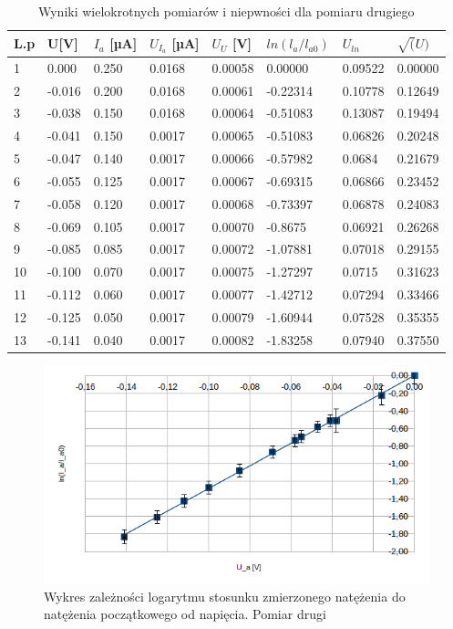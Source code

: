 \documentclass[a4paper]{article}
\begin{document}
\begin{table}[h!]
\centering
 \begin{tabular}{ | l | l | l | l | l | l | l | l | }
 \hline
L.p & U[V] & $I_{a}$ [µA] & $U_{I_{a}}$ [µA] & $U_{U}$ [V] & $ln(l_{a}/l_{a0})$ & $U_{ln}$ & $\sqrt(U)$ \\ \hline
1 & 0.000 & 0.250 & 0.0168 & 0.00058 & 0.00000 & 0.09522 & 0.00000 \\ \hline
2 & -0.016 & 0.200 & 0.0168 & 0.00061 & -0.22314 & 0.10778 & 0.12649 \\ \hline
3 & -0.038 & 0.150 & 0.0168 & 0.00064 & -0.51083 & 0.13087 & 0.19494 \\ \hline
4 & -0.041 & 0.150 & 0.0017 & 0.00065 & -0.51083 & 0.06826 & 0.20248 \\ \hline
5 & -0.047 & 0.140 & 0.0017 & 0.00066 & -0.57982 & 0.0684 & 0.21679 \\ \hline
6 & -0.055 & 0.125 & 0.0017 & 0.00067 & -0.69315 & 0.06866 & 0.23452 \\ \hline
7 & -0.058 & 0.120 & 0.0017 & 0.00068 & -0.73397 & 0.06878 & 0.24083 \\ \hline
8 & -0.069 & 0.105 & 0.0017 & 0.00070 & -0.8675 & 0.06921 & 0.26268 \\ \hline
9 & -0.085 & 0.085 & 0.0017 & 0.00072 & -1.07881 & 0.07018 & 0.29155 \\ \hline
10 & -0.100 & 0.070 & 0.0017 & 0.00075 & -1.27297 & 0.0715 & 0.31623 \\ \hline
11 & -0.112 & 0.060 & 0.0017 & 0.00077 & -1.42712 & 0.07294 & 0.33466 \\ \hline
12 & -0.125 & 0.050 & 0.0017 & 0.00079 & -1.60944 & 0.07528 & 0.35355 \\ \hline
13 & -0.141 & 0.040 & 0.0017 & 0.00082 & -1.83258 & 0.07940 & 0.37550 \\ \hline
 \end{tabular}
	\caption{Wyniki wielokrotnych pomiarów i niepwności dla pomiaru drugiego}
	\label{pomiary-2}
\end{table}

\begin{figure}[h!]
	\centering
	\includegraphics[scale=0.8]{T2_ln_U}
	\caption{Wykres zależności logarytmu stosunku zmierzonego natężenia do natężenia początkowego od napięcia. Pomiar drugi}
	\label{fig-2}
\end{figure}
\end{document}
